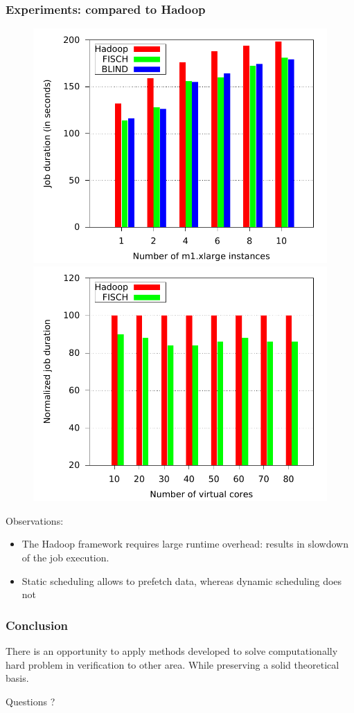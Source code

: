 \documentclass{beamer}
\newcommand{\hadoop}{\textsf{Hadoop}\xspace}
\begin{document}
\begin{frame}
  \frametitle{ Experiments: compared to \hadoop }

  \begin{figure}
    \includegraphics[scale=0.4]{comp_hadoop_1}
    \hspace{1ex}
    \includegraphics[scale=0.4]{comp_hadoop_2}
  \end{figure}
  
  \vfill

  Observations:
  \begin{itemize}
  \item The Hadoop framework requires large runtime overhead: results in slowdown of the job execution.
  \item Static scheduling allows to prefetch data, whereas dynamic scheduling does not
  \end{itemize}

\end{frame}

\begin{frame}
  \frametitle{Conclusion}

  There is an opportunity to apply methods developed to solve computationally hard problem in verification to other area.
  While preserving a solid theoretical basis.

  \hfill

  \begin{center}
  \huge
  Questions ?
  \end{center}
\end{frame}
\end{document}
